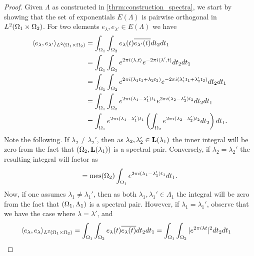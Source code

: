 \documentclass[../thesis.tex]{subfiles}
\begin{document}
\begin{proof}
    Given $\Lambda$ as constructed in \cref{thrm:construction_spectra}, we start by showing that the set of exponentials $E(\Lambda)$ is pairwise orthogonal in $L^2(\Omega_1 \times \Omega_2)$. For two elements $e_\lambda,e_{\lambda'} \in E(\Lambda)$ we have %
    \begin{align*}
        \langle e_\lambda,e_{\lambda'}\rangle_{L^2(\Omega_1 \times \Omega_2)} 
        &= \int_{\Omega_1} \int_{\Omega_2} e_{\lambda}(t) \overline{e_{\lambda'}(t)} dt_2 dt_1\\ 
        &= \int_{\Omega_1} \int_{\Omega_2} e^{2\pi i \langle\lambda, t\rangle } e^{-2\pi i  \langle\lambda', t\rangle} dt_2 dt_1\\ 
        &= \int_{\Omega_1} \int_{\Omega_2} e^{2\pi i (\lambda_1 t_1+\lambda_2 t_2)} e^{-2\pi i(\lambda_1' t_1+\lambda_2' t_2)} dt_2 dt_1\\ 
        &= \int_{\Omega_1} \int_{\Omega_2} e^{2\pi i (\lambda_1- \lambda_1')t_1} e^{2\pi i (\lambda_2 - \lambda_2')t_2} dt_2 dt_1\\ 
        &= \int_{\Omega_1} e^{2\pi i  (\lambda_1- \lambda_1')t_1} \left(\int_{\Omega_2}  e^{2\pi i (\lambda_2 - \lambda_2')t_2} dt_2\right) dt_1.
    \end{align*}
    Note the following. If $\lambda_2 \neq \lambda_2'$, then as $\lambda_2, \lambda_2' \in \mathbf{L}(\lambda_1)$ the inner integral will be zero from the fact that $(\Omega_2, \mathbf{L}(\lambda_1))$ is a spectral pair. Conversely, if $\lambda_2 = \lambda_2'$ the resulting integral will factor as %
    \begin{align*}
        = \operatorname{mes}(\Omega_2) \int_{\Omega_1} e^{2\pi i  (\lambda_1- \lambda_1')t_1} dt_1.
    \end{align*}
    Now, if one assumes $\lambda_1 \neq \lambda_1'$, then as both $\lambda_1, \lambda_1' \in \Lambda_1$ the integral will be zero from the fact that $(\Omega_1, \Lambda_1)$ is a spectral pair. However, if $\lambda_1 = \lambda_1'$, observe that we have the case where $\lambda = \lambda'$, and
    \begin{align*}
        \braa{e_\lambda, e_\lambda}_{L^2\brac{\Omega_1 \times \Omega_2}}
        &= \int_{\Omega_1} \int_{\Omega_2} e_{\lambda}(t) \overline{e_{\lambda}(t)} dt_2 dt_1
        =\int_{\Omega_1} \int_{\Omega_2} |e^{2 \pi i \lambda t}|^2 dt_2 dt_1

\end{align*}
\end{proof}
\end{document}
